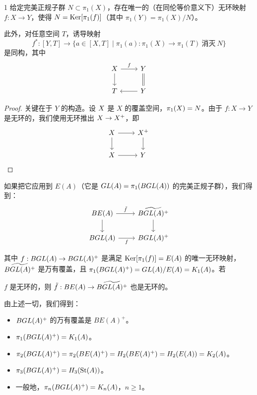 \begin{thm}{1} 给定完美正规子群 $N\subset\pi_1(X)$，存在唯一的（在同伦等价意义下）无环映射 $f:X\to Y$，使得 $N=\operatorname{Ker}[\pi_1(f)]$（其中 $\pi_1(Y)=\pi_1(X)/N$）。 \end{thm}


此外，对任意空间 $T$，诱导映射
\[ f^*:[Y,T]\to\{a\in[X,T]\mid\pi_1(a):\pi_1(X)\to\pi_1(T)\ \text{消灭}\ N\} \]
是同构，其中
\[
\begin{tikzcd}
X \arrow[r,"f"] \arrow[d] & Y \arrow[d,equal] \\
T & Y \arrow[l]
\end{tikzcd}
\]

\begin{proof}
关键在于 $Y$ 的构造。设 $ X$ 是 $X$ 的覆盖空间，$\pi_1( X)=N$。由于 $f:X\to Y$ 是无环的，我们使用无环推出 $ X\to X^+$，即
\[
\begin{tikzcd}
\wt X \arrow[r] \arrow[d] & \wt X^+ \arrow[d] \\
X \arrow[r] & Y
\end{tikzcd}
\]
\end{proof}

如果把它应用到 $E(A)$（它是 $GL(A)=\pi_1(BGL(A))$ 的完美正规子群），我们得到：
\[
\begin{tikzcd}
BE(A) \arrow[r,"\tilde f"] \arrow[d] & \widetilde{B\GL(A)^+} \arrow[d] \\
B\GL(A) \arrow[r,"f"'] & B\GL(A)^+
\end{tikzcd}
\]

其中 $f:BGL(A)\to BGL(A)^+$ 是满足 $\operatorname{Ker}[\pi_1(f)]=E(A)$ 的唯一无环映射，$\widetilde{BGL(A)^+}$ 是万有覆盖，且 $\pi_1(BGL(A)^+)=GL(A)/E(A)=K_1(A)$。若


$f$ 是无环的，则 $\tilde f:BE(A)\to\widetilde{BGL(A)^+}$ 也是无环的。

由上述一切，我们得到：
\begin{itemize}[leftmargin=1.6em,itemsep=2pt]
\item $BGL(A)^+$ 的万有覆盖是 $BE(A)^+$。
\item $\pi_1(BGL(A)^+)=K_1(A)$。
\item $\pi_2(BGL(A)^+)=\pi_2(BE(A)^+)=H_2(BE(A)^+)=H_2(E(A))=K_2(A)$。
\item $\pi_3(BGL(A)^+)=H_3(\mathrm{St}(A))$。
\item 一般地，$\pi_n(BGL(A)^+)=K_n(A)$，$n\ge 1$。
\end{itemize}

